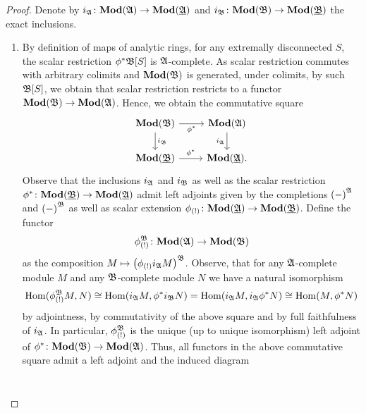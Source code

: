 \begin{proof}
	Denote by $i_\preAnaRing{A}\colon \mod{\preAnaRing{A}}\to\mod{\underlying{A}}$ and $i_\preAnaRing{B}\colon \mod{\preAnaRing{B}}\to\mod{\underlying{B}}$ the exact inclusions.
	\begin{enumerate}
		\item
		By definition of maps of analytic rings, for any extremally disconnected $S$, the scalar restriction $\scalarRestriction{\phi}\pfree{B}{S}$ is $\preAnaRing{A}$-complete. As scalar restriction commutes with arbitrary colimits and $\mod{\preAnaRing{B}}$ is generated, under colimits, by such $\pfree{B}{S}$, we obtain that scalar restriction restricts to a functor $\mod{\preAnaRing{B}}\to\mod{\preAnaRing{A}}$. Hence, we obtain the commutative square
		$$\begin{tikzcd}
			\mod{\preAnaRing{B}} \ar[r, "\scalarRestriction{\phi}", swap]\ar[d, "i_\preAnaRing{B}"] &\mod{\preAnaRing{A}}\ar[d, "i_\preAnaRing{A}", swap]\\
			\mod{\underlying{B}}\ar[r, "\scalarRestriction{\phi}"]&\mod{\underlying{A}}.
		\end{tikzcd}$$
		Observe that the inclusions $i_\preAnaRing{A}$ and $i_\preAnaRing{B}$ as well as the scalar restriction $\scalarRestriction{\phi}\colon \mod{\underlying{B}}\to \mod{\underlying{A}}$ admit left adjoints given by the completions $\completion{-}{\preAnaRing{A}}$ and $\completion{-}{\preAnaRing{B}}$ as well as scalar extension $\scalarExtension{\phi}\colon \mod{\underlying{A}}\to\mod{\underlying{B}}$. Define the functor
			$$\completedScalarExtension{\phi}{\preAnaRing{B}}\colon \mod{\preAnaRing{A}}\to\mod{\preAnaRing{B}}$$
		as the composition $M\mapsto \completion{\scalarExtension{\phi} i_\preAnaRing{A}M}{\preAnaRing{B}}$. Observe, that for any $\preAnaRing{A}$-complete module $M$ and any $\preAnaRing{B}$-complete module $N$ we have a natural isomorphism
			$$\Hom(\completedScalarExtension{\phi}{\preAnaRing{B}}M, N) \cong \Hom(i_\preAnaRing{A}M, \scalarRestriction{\phi}i_\preAnaRing{B} N) = \Hom(i_\preAnaRing{A}M, i_\preAnaRing{A}\scalarRestriction{\phi} N) \cong \Hom(M, \scalarRestriction{\phi} N)$$
		by adjointness, by commutativity of the above square and by full faithfulness of $i_\preAnaRing{A}$. In particular, $\completedScalarExtension{\phi}{\preAnaRing{B}}$ is the unique (up to unique isomorphism) left adjoint of $\scalarRestriction{\phi}\colon \mod{\preAnaRing{B}}\to\mod{\preAnaRing{A}}$. Thus, all functors in the above commutative square admit a left adjoint and the induced diagram
		$$\begin{tikzcd}

\end{tikzcd}$$
\end{enumerate}
\end{proof}
